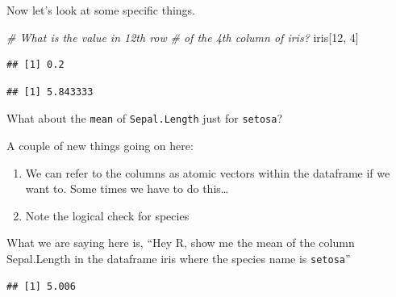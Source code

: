 \documentclass[
]{book}
\newenvironment{Shaded}{\begin{snugshade}}{\end{snugshade}}
\newcommand{\CommentTok}[1]{\textcolor[rgb]{0.56,0.35,0.01}{\textit{#1}}}
\newcommand{\DecValTok}[1]{\textcolor[rgb]{0.00,0.00,0.81}{#1}}
\newcommand{\KeywordTok}[1]{\textcolor[rgb]{0.13,0.29,0.53}{\textbf{#1}}}
\newcommand{\NormalTok}[1]{#1}
\newcommand{\OperatorTok}[1]{\textcolor[rgb]{0.81,0.36,0.00}{\textbf{#1}}}
\newcommand{\StringTok}[1]{\textcolor[rgb]{0.31,0.60,0.02}{#1}}
\begin{document}
Now let's look at some specific things.

\begin{Shaded}
\begin{Highlighting}[]
\CommentTok{# What is the value in 12th row}
\CommentTok{# of the 4th column of iris?}
\NormalTok{iris[}\DecValTok{12}\NormalTok{, }\DecValTok{4}\NormalTok{]}
\end{Highlighting}
\end{Shaded}

\begin{verbatim}
## [1] 0.2
\end{verbatim}

\begin{Shaded}
\end{Shaded}

\begin{verbatim}
## [1] 5.843333
\end{verbatim}

What about the \texttt{mean} of \texttt{Sepal.Length} just for \texttt{setosa}?

A couple of new things going on here:

\begin{enumerate}
\def\labelenumi{\arabic{enumi}.}
\item
  We can refer to the columns as atomic vectors within the dataframe if we want to. Some times we have to do this\ldots{}
\item
  Note the logical check for species
\end{enumerate}

What we are saying here is, ``Hey R, show me the mean of the column Sepal.Length in the dataframe iris where the species name is \texttt{setosa}''

\begin{Shaded}
\end{Shaded}

\begin{verbatim}
## [1] 5.006
\end{verbatim}
\end{document}
